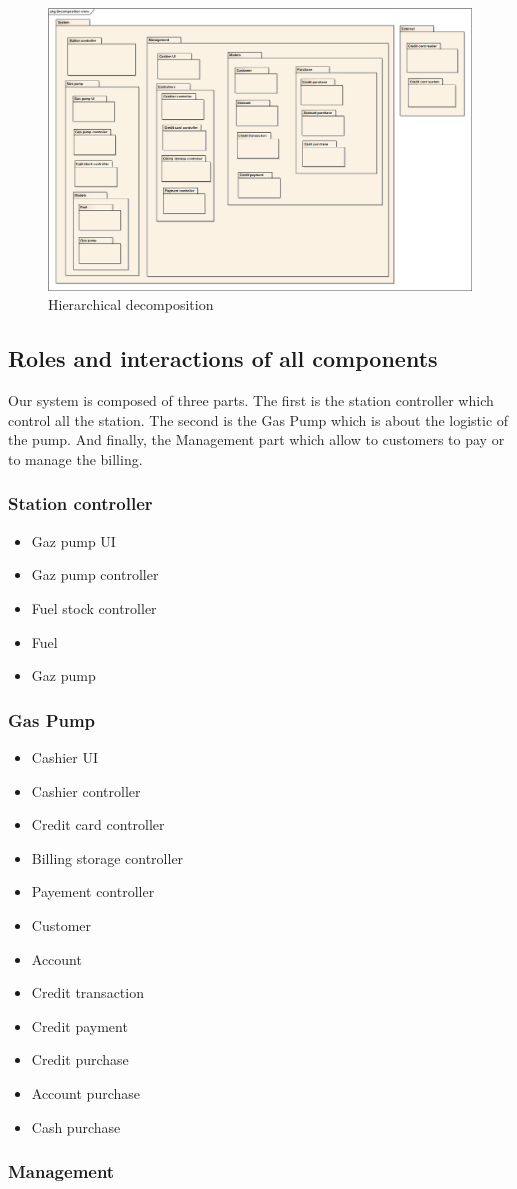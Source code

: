 \documentclass[11pt,a4paper]{article}
\begin{document}
\begin{figure}[H]
 \centering
 \includegraphics[width=\textwidth]{../DecompositionView.png} 
 \caption{Hierarchical decomposition}
 \label{fig:dep}
\end{figure}

\subsection{Roles and interactions of all components}

Our system is composed of three parts. The first is the station controller which control all the station. The second is the Gas Pump which is about the logistic of the pump. And finally, the Management part which allow to customers to pay or to manage the billing.

\subsubsection*{Station controller}
\begin{itemize}
\item{Gaz pump UI}
\item{Gaz pump controller}
\item{Fuel stock controller}
\item{Fuel}
\item{Gaz pump}
\end{itemize}
\subsubsection*{Gas Pump}
\begin{itemize}
\item{Cashier UI}
\item{Cashier controller}
\item{Credit card controller}
\item{Billing storage controller}
\item{Payement controller}
\item{Customer}
\item{Account}
\item{Credit transaction}
\item{Credit payment}
\item{Credit purchase}
\item{Account purchase}
\item{Cash purchase}
\end{itemize}
\subsubsection*{Management}
\end{document}
